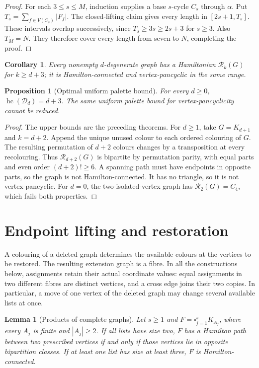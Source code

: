\documentclass[11pt]{article}
\newtheorem{lemma}[theorem]{Lemma}
\newtheorem{proposition}[theorem]{Proposition}
\newtheorem{corollary}[theorem]{Corollary}
\theoremstyle{remark}
\newcommand{\R}{\mathcal R}
\newcommand{\Rk}{\mathcal R_k}
\newcommand{\hc}{\operatorname{hc}}
\numberwithin{equation}{section}
\numberwithin{table}{section}
\begin{document}
\begin{proof}
For each $3\le s\le M$, induction supplies a base $s$-cycle $C_s$
through $\alpha$. Put $T_s=\sum_{f\in V(C_s)}|F_f|$.
The closed-lifting claim gives every length in $[2s+1,T_s]$.
These intervals overlap successively, since $T_s\ge3s\ge2s+3$
for $s\ge3$. Also $T_M=N$. They therefore cover every length
from seven to $N$, completing the proof.
\end{proof}


\begin{corollary}
\label{cor:degenerate-hamiltonian}
Every nonempty $d$-degenerate graph has a Hamiltonian $\Rk(G)$ for $k\ge d+3$; it is Hamilton-connected and vertex-pancyclic in the same range.
\end{corollary}


\begin{proposition}[Optimal uniform palette bound]\label{prop:degenerate-sharp}
For every $d\ge0$, $\hc(\mathcal D_d)=d+3$. The same uniform palette
bound for vertex-pancyclicity cannot be reduced.
\end{proposition}
\begin{proof}
The upper bounds are the preceding theorems. For $d\ge1$, take
$G=K_{d+1}$ and $k=d+2$. Append the unique unused colour to each
ordered colouring of $G$. The resulting permutation of $d+2$ colours
changes by a transposition at every recolouring. Thus $\R_{d+2}(G)$
is bipartite by permutation parity, with equal parts and even order
$(d+2)!\ge6$. A spanning path must have endpoints in opposite parts,
so the graph is not Hamilton-connected. It has no triangle, so it is
not vertex-pancyclic. For $d=0$, the two-isolated-vertex graph has
$\R_2(G)=C_4$, which fails both properties.
\end{proof}

\section{Endpoint lifting and restoration}
\label{sec:restoration}

A colouring of a deleted graph determines the available colours at the
vertices to be restored.  The resulting extension graph is a fibre.  In
all the constructions below, assignments retain their actual coordinate
values: equal assignments in two different fibres are distinct vertices,
and a cross edge joins their two copies.  In particular, a move of one
vertex of the deleted graph may change several available lists at once.

\begin{lemma}[Products of complete graphs]
\label{lem:product}
Let $s\ge1$ and $F=\square_{j=1}^s K_{A_j}$, where every $A_j$ is
finite and $|A_j|\ge2$.  If all lists have size two, $F$ has a
Hamilton path between two prescribed vertices if and only if those
vertices lie in opposite bipartition classes.  If at least one list has
size at least three, $F$ is Hamilton-connected.
\end{lemma}
\end{document}

